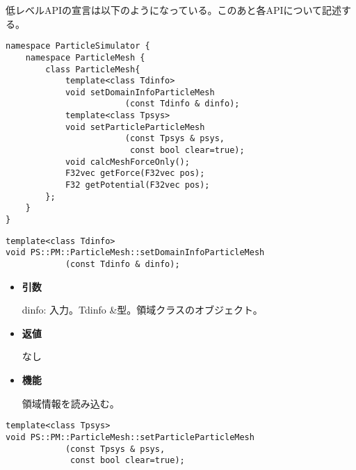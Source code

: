 
低レベルAPIの宣言は以下のようになっている。このあと各APIについて記述す
る。
\begin{lstlisting}[caption=ParticleMesh1]
namespace ParticleSimulator {
    namespace ParticleMesh {
        class ParticleMesh{
            template<class Tdinfo>
            void setDomainInfoParticleMesh
                        (const Tdinfo & dinfo);
            template<class Tpsys>
            void setParticleParticleMesh
                        (const Tpsys & psys,
                         const bool clear=true);
            void calcMeshForceOnly();
            F32vec getForce(F32vec pos);
            F32 getPotential(F32vec pos);
        };
    }
}
\end{lstlisting}


\begin{screen}
\begin{verbatim}
template<class Tdinfo>
void PS::PM::ParticleMesh::setDomainInfoParticleMesh
            (const Tdinfo & dinfo);
\end{verbatim}
\end{screen}

\begin{itemize}

\item {\bf 引数}

dinfo: 入力。Tdinfo \&型。領域クラスのオブジェクト。

\item {\bf 返値}

なし

\item {\bf 機能}

領域情報を読み込む。

\end{itemize}


\begin{screen}
\begin{verbatim}
template<class Tpsys>
void PS::PM::ParticleMesh::setParticleParticleMesh
            (const Tpsys & psys,
             const bool clear=true);
\end{verbatim}
\end{screen}

